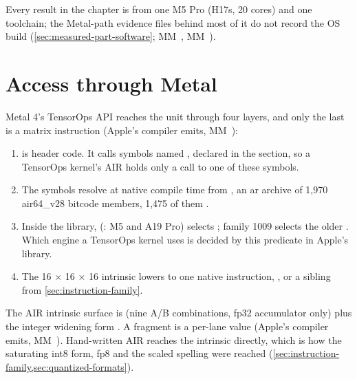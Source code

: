 Every result in the chapter is from one M5 Pro (H17s, 20 cores) and one toolchain; the Metal-path evidence files behind
most of it do not record the OS build (\cref{sec:measured-part-software}; MM~, MM~).

\section{Access through Metal}\label{sec:it-reached}

Metal 4's TensorOps API reaches the unit through four layers, and only the last is a matrix instruction (Apple's
compiler emits, MM~):

\begin{enumerate}
\def\labelenumi{\arabic{enumi}.}
\item {} is header code. It calls  symbols
  named , declared in the 
  section, so a TensorOps kernel's AIR holds only a call to one of these symbols.
\item The symbols resolve at native compile time from
  , an ar archive of 1,970 air64\_v28 bitcode
  members, 1,475 of them .
\item Inside the library,  (: M5 and A19 Pro) selects
  ; family 1009 selects the older
  . Which engine a TensorOps kernel uses is decided by this
  predicate in Apple's library.
\item The 16 × 16 × 16 intrinsic lowers to one native instruction, , or
  a sibling from \cref{sec:instruction-family}.
\end{enumerate}

The AIR intrinsic surface is
 (nine A/B combinations, fp32
accumulator only) plus the integer widening form . A fragment is a per-lane
 value (Apple's compiler emits, MM~). Hand-written AIR reaches the intrinsic directly, which is how the
saturating int8 form, fp8 and the scaled spelling were reached (\cref{sec:instruction-family,sec:quantized-formats}).

